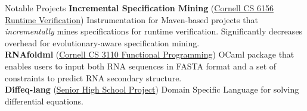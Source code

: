  
\begin{rSection}{Notable Projects}
	\textbf{Incremental Specification Mining} (\href{https://github.com/cyankaet/spec-miners}{Cornell CS 6156 Runtime Verification\ExternalLink}) Instrumentation for Maven-based projects that \textit{incrementally} mines specifications for runtime verification. Significantly decreases overhead for evolutionary-aware specification mining.
	\\
	\textbf{RNAfoldml} (\href{https://github.com/jpVinnie/RNAfoldml/}{Cornell CS 3110 Functional Programming\ExternalLink}) OCaml package that enables users to input both RNA sequences in FASTA format and a set of constraints to predict RNA secondary structure.
	\\
	\textbf{Diffeq-lang} (\href{https://github.com/jpVinnie/diffeq-lang/}{Senior High School Project\ExternalLink}) Domain Specific Language for solving differential equations.
\end{rSection}